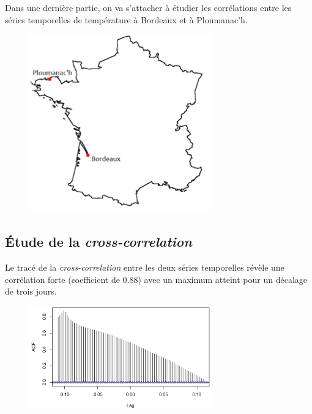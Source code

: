 \documentclass[../report.tex]{subfiles}
\begin{document}
\par Dans une dernière partie, on va s’attacher à étudier les corrélations entre les séries temporelles de température à Bordeaux et à Ploumanac’h. 

\begin{figure}[H]
  \centering
    \includegraphics[width=0.7\textwidth]{images/part_3/france.png}
\end{figure}

\subsection{Étude de la \emph{cross-correlation}}

\par Le tracé de la \emph{cross-correlation} entre les deux séries temporelles révèle une corrélation forte (coefficient de 0.88) avec un maximum atteint pour un décalage de trois jours.

\begin{figure}[H]
  \centering
    \includegraphics[width=0.7\textwidth]{images/part_3/crosscorrelation.png}
\end{figure}
\end{document}
